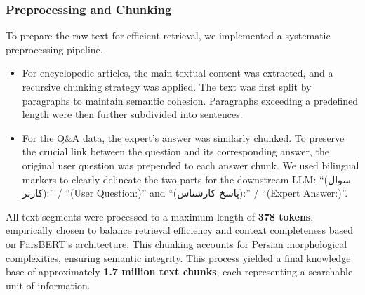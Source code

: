 \documentclass[11pt]{article}
\newcommand{\fa}[1]{\textfarsi{#1}}
\begin{document}
\subsubsection{Preprocessing and Chunking}

To prepare the raw text for efficient retrieval, we implemented a systematic preprocessing pipeline.

\begin{itemize}
    \item For encyclopedic articles, the main textual content was extracted, and a recursive chunking strategy was applied. The text was first split by paragraphs to maintain semantic cohesion. Paragraphs exceeding a predefined length were then further subdivided into sentences.
  \item For the Q\&A data, the expert's answer was similarly chunked. To preserve the crucial link between the question and its corresponding answer, the original user question was prepended to each answer chunk. We used bilingual markers to clearly delineate the two parts for the downstream LLM: ``\fa{(سوال کاربر):}'' / ``(User Question:)'' and ``\fa{(پاسخ کارشناس):}'' / ``(Expert Answer:)''.
\end{itemize}

All text segments were processed to a maximum length of \textbf{378 tokens}, empirically chosen to balance retrieval efficiency and context completeness based on ParsBERT's architecture. \cite{Farahani_2021} This chunking accounts for Persian morphological complexities, ensuring semantic integrity. This process yielded a final knowledge base of approximately \textbf{1.7 million text chunks}, each representing a searchable unit of information.
\end{document}
